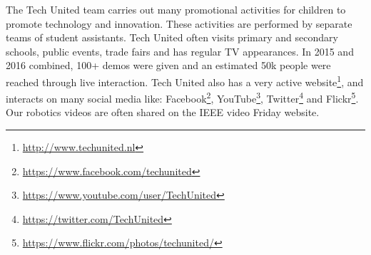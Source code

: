 The Tech United team carries out many promotional activities for children to promote technology and innovation. These activities are performed by separate teams of student assistants. Tech United often visits primary and secondary schools, public events, trade fairs and has regular TV appearances. In 2015 and 2016 combined, 100+ demos were given and an estimated 50k people were reached through live interaction.
Tech United also has a very active website\footnote{\url{http://www.techunited.nl}}, and interacts on many social media like: Facebook\footnote{\url{https://www.facebook.com/techunited}}, YouTube\footnote{\url{https://www.youtube.com/user/TechUnited}}, Twitter\footnote{\url{https://twitter.com/TechUnited}} and Flickr\footnote{\url{https://www.flickr.com/photos/techunited/}}. Our robotics videos are often shared on the IEEE video Friday website. 